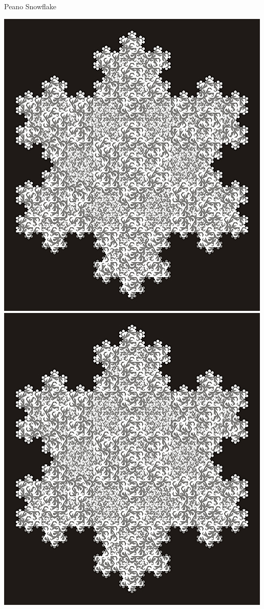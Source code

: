 \documentclass{beamer}
\begin{document}
\begin{frame}{Peano Snowflake}
	\begin{center}
            {\href{file:///D:/Dropbox/Michael Gogins/Garden of Algorithms/04-Bending Arches.wav}{\includegraphics[scale=1.375]{peano_snowflake}}}
            {\href{https://www.youtube.com/watch?v=eJ_d_3wV6i0}{\includegraphics[scale=1.375]{peano_snowflake}}}
	\end{center}
\end{frame}
\end{document}

